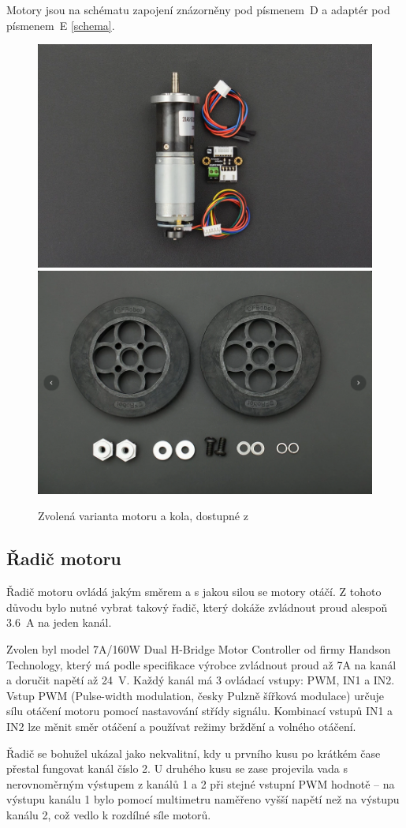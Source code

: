 Motory jsou na schématu zapojení znázorněny pod písmenem~D a adaptér pod písmenem~E \ref{schema}.

\begin{figure}[H]
  \centering
  \includegraphics[width=0.5\linewidth]{obrazky-figures/motor.png}\hfill
  \includegraphics[width=0.5\linewidth]{obrazky-figures/wheel.png}
  \caption{Zvolená varianta motoru a kola, dostupné z \cite{motor_kolo}}
  \label{motor_kolo}
\end{figure}


\subsection*{Řadič motoru}
\label{driver_sec}
Řadič motoru ovládá jakým směrem a s jakou silou se motory otáčí. Z tohoto důvodu bylo nutné vybrat takový řadič, který dokáže zvládnout proud alespoň 3.6~A na jeden kanál.

Zvolen byl model 7A/160W Dual H-Bridge Motor Controller od firmy Handson Technology, který má podle specifikace výrobce zvládnout proud až 7A na kanál a doručit napětí až 24~V. Každý kanál má 3 ovládací vstupy: PWM, IN1 a IN2. Vstup PWM (Pulse-width modulation, česky Pulzně šířková modulace) určuje sílu otáčení motoru pomocí nastavování střídy signálu. Kombinací vstupů IN1 a IN2 lze měnit směr otáčení a používat režimy brždění a volného otáčení. \cite{driver1}

Řadič se bohužel ukázal jako nekvalitní, kdy u prvního kusu po krátkém čase přestal fungovat kanál číslo 2. U druhého kusu se zase projevila vada s nerovnoměrným výstupem z kanálů 1 a 2 při stejné vstupní PWM hodnotě -- na výstupu kanálu 1 bylo pomocí multimetru naměřeno vyšší napětí než na výstupu kanálu 2, což vedlo k rozdílné síle motorů.

